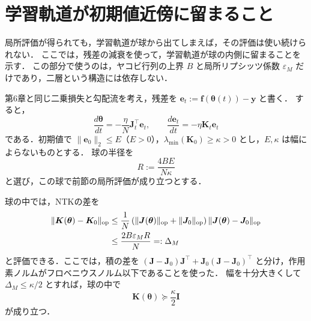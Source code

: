 \documentclass[../main.tex]{subfiles}
\begin{document}
\section{学習軌道が初期値近傍に留まること}

局所評価が得られても，学習軌道が球から出てしまえば，その評価は使い続けられない．
ここでは，残差の減衰を使って，学習軌道が球の内側に留まることを示す．
この部分で使うのは，ヤコビ行列の上界 $B$ と局所リプシッツ係数 $\varepsilon_M$ だけであり，二層という構造には依存しない．

第6章と同じ二乗損失と勾配流を考え，残差を $\bm{e}_t:=\bm{f}(\bm{\theta}(t))-\bm{y}$ と書く．
すると，
\begin{equation}
  \frac{d\bm{\theta}}{dt}
  =-\frac{\eta}{N}\bm{J}_t^\top\bm{e}_t,
  \qquad
  \frac{d\bm{e}_t}{dt}=-\eta\bm{K}_t\bm{e}_t
  \label{eq:app-ntk-flow}
\end{equation}
である．初期値で $\|\bm{e}_0\|_2\leq E$（$E>0$），$\lambda_{\min}(\bm{K}_0)\geq\kappa>0$ とし，$E,\kappa$ は幅によらないものとする．
球の半径を
\begin{equation}
  R:=\frac{4BE}{N\kappa}
  \label{eq:app-ntk-radius}
\end{equation}
と選び，この球で前節の局所評価が成り立つとする．

球の中では，NTKの差を
\begin{align}
  \|\bm{K}(\bm{\theta})-\bm{K}_0\|_{\mathrm{op}}
  &\leq\frac1N\left(
    \|\bm{J}(\bm{\theta})\|_{\mathrm{op}}
    +\|\bm{J}_0\|_{\mathrm{op}}\right)
    \|\bm{J}(\bm{\theta})-\bm{J}_0\|_{\mathrm{op}}\notag\\
  &\leq\frac{2B\varepsilon_M R}{N}
  =:\Delta_M
  \label{eq:app-ntk-kernel-bound}
\end{align}
と評価できる．ここでは，積の差を
$(\bm{J}-\bm{J}_0)\bm{J}^\top
+\bm{J}_0(\bm{J}-\bm{J}_0)^\top$ と分け，作用素ノルムがフロベニウスノルム以下であることを使った．
幅を十分大きくして $\Delta_M\leq\kappa/2$ とすれば，球の中で
\begin{equation}
  \bm{K}(\bm{\theta})\succeq\frac{\kappa}{2}\bm{I}
  \label{eq:app-ntk-kernel-gap}
\end{equation}
が成り立つ．
\end{document}
